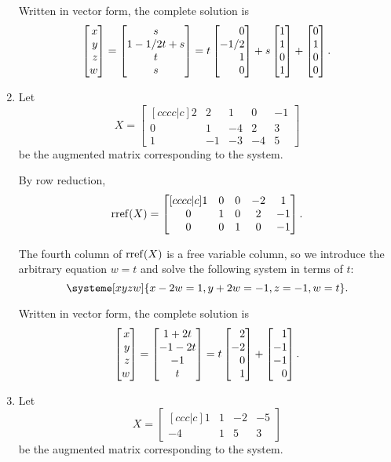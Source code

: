 \begin{exercises}
\begin{problist}
\begin{solution}
\begin{enumerate}
				Written in vector form, the complete solution is
				\[
					\mat{x\\y\\z\\w} = \matc{s\\1-1/2t+s\\t\\s}
					=t\mat{0\\-1/2\\1\\0}+s\mat{1\\1\\0\\1}+\mat{0\\1\\0\\0}.
				\]
				\item 
				Let
				\[
					X=
					\begin{bmatrix}[cccc|c]
						2 & 2 & 1 & 0 & -1\\
						0 & 1 & -4 & 2 & 3\\
						1 & -1 & -3 & -4 & 5
					\end{bmatrix}
				\]
				be the augmented matrix corresponding to the system.
				
				By row reduction,
				\[
					\operatorname{rref}(X)=
					\begin{bmatrix}[cccc|c]
						1 & 0 & 0 & -2 & 1\\
						0 & 1 & 0 & 2 & -1\\
						0 & 0 & 1 & 0 & -1
					\end{bmatrix}.
				\]
				
				The fourth column of $\operatorname{rref}(X)$ is a free variable column,
				so we introduce the arbitrary equation $w=t$ and solve the following system
				in terms of $t$:
				\[
					\systeme[xyzw]{x-2w=1,y+2w=-1,z=-1,w=t}.
				\]
				
				Written in vector form, the complete solution is
				\[
				\mat{x\\y\\z\\w} = \matc{1+2t\\-1-2t\\-1\\t} = t\mat{2\\-2\\0\\1}+\mat{1\\-1\\-1\\0}.
				\]
				\item 
				Let
				\[
					X=
					\begin{bmatrix}[ccc|c]
						1 & 1 & -2 & -5\\
						-4 & 1 & 5 & 3
					\end{bmatrix}
				\]
				be the augmented matrix corresponding to the system.
				

\end{enumerate}
\end{solution}
\end{problist}
\end{exercises}
